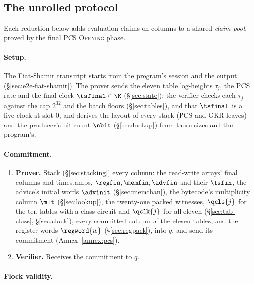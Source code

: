 \subsection{The unrolled protocol}\label{sec:e2e-unrolled}

Each reduction below adds evaluation claims on columns to a shared \emph{claim pool}, proved by the final PCS \textsc{Opening} phase.

\paragraph{Setup.}

The Fiat-Shamir transcript starts from the program's session and the output (\S\ref{sec:e2e-fiat-shamir}). The prover sends the eleven table log-heights $\tau_j$, the PCS rate and the final clock $\tsfinal\in\K$ (\S\ref{sec:state}); the verifier checks each $\tau_j$ against the cap $2^{32}$ and the batch floors (\S\ref{sec:tables}), and that $\tsfinal$ is a live clock at slot $0$, and derives the layout of every stack (PCS and GKR leaves) and the producer's bit count $\nbit$ (\S\ref{sec:lookup}) from those sizes and the program's.

\paragraph{Commitment.}

\begin{enumerate}
\item \textbf{Prover.} Stack (\S\ref{sec:stacking}) every column: the read-write arrays' final columns and timestamps, $\regfin,\memfin,\advfin$ and their $\tsfin$, the advice's initial words $\advinit$ (\S\ref{sec:memchan}), the bytecode's multiplicity column $\mlt$ (\S\ref{sec:lookup}), the twenty-one packed witnesses, $\qcls{j}$ for the ten tables with a class circuit and $\qclk{j}$ for all eleven (\S\ref{sec:tab-class}, \S\ref{sec:clock}), every committed column of the eleven tables, and the register words $\regword{w}$ (\S\ref{sec:regpack}), into $q$, and send its commitment (Annex~\ref{annex:pcs}).
\item \textbf{Verifier.} Receives the commitment to $q$.
\end{enumerate}

\paragraph{Flock validity.}

